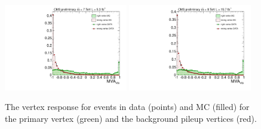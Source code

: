 \begin{figure}
  \includegraphics[width=0.48\textwidth]{analysis_comps/plots/vertex_bdt_output_7TeV.pdf}
  \includegraphics[width=0.48\textwidth]{analysis_comps/plots/vertex_bdt_output_8TeV.pdf}
  \caption{The vertex \BDT response for \Zmumu events in data (points) and MC (filled) for the primary vertex (green) and the background pileup vertices (red).}
  \label{fig:vertex_bdt_response}
\end{figure}

